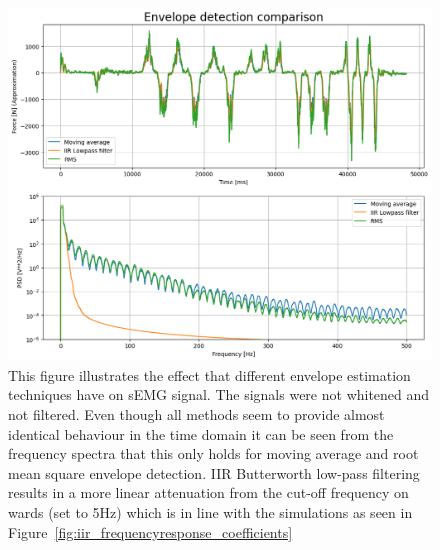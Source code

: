 \begin{figure}[h!t]
	\begin{center}
		\includegraphics[width=1.0\columnwidth]{images/measurement_envelopes.png}
	\end{center}
	\caption{This figure illustrates the effect that different envelope estimation techniques have on sEMG signal. The signals were not whitened and not filtered. Even though all methods seem to provide almost identical behaviour in the time domain it can be seen from the frequency spectra that this only holds for moving average and root mean square envelope detection. IIR Butterworth low-pass filtering results in a more linear attenuation from the cut-off frequency on wards (set to 5Hz) which is in line with the simulations as seen in Figure~\ref{fig:iir_frequencyresponse_coefficients}}
	\label{fig:result_envelopes}
\end{figure}